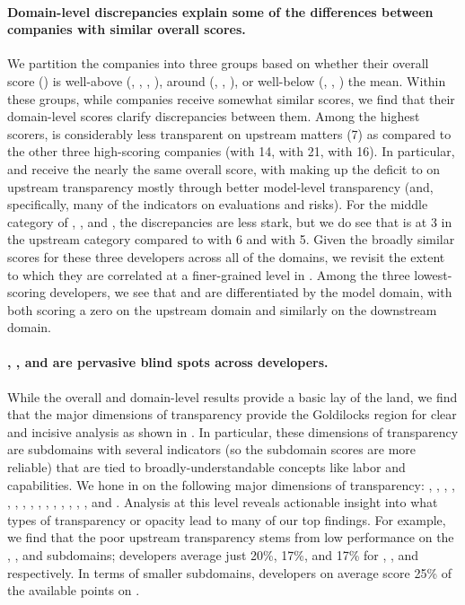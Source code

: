 \paragraph{Domain-level discrepancies explain some of the differences between companies with similar overall scores.}
We partition the \numcompanies companies into three groups based on whether their overall score () is well-above (\meta, \huggingface, \openai, \stability), around (\google, \anthropic, \cohere), or well-below (\aitwentyone, \inflection, \amazon) the mean. 
Within these groups, while companies receive somewhat similar scores, we find that their domain-level scores clarify discrepancies between them. 
Among the highest scorers, \openai is considerably less transparent on upstream matters (7) as compared to the other three high-scoring companies (\meta with 14, \huggingface with 21, \stability with 16).
In particular, \openai and \stability receive the nearly the same overall score, with \openai making up the deficit to \stability on upstream transparency mostly through better model-level transparency (and, specifically, many of the indicators on evaluations and risks).
For the middle category of \google, \anthropic, and \cohere, the discrepancies are less stark, but we do see that \cohere is at 3 in the upstream category compared to \google with 6 and \anthropic with 5.
Given the broadly similar scores for these three developers across all of the domains, we revisit the extent to which they are correlated at a finer-grained level in .
Among the three lowest-scoring developers, we see that \aitwentyone and \inflection are differentiated by the model domain, with both scoring a zero on the upstream domain and similarly on the downstream domain.

\paragraph{\data, \labor, and \compute are pervasive blind spots across developers.} 
While the overall and domain-level results provide a basic lay of the land, we find that the major dimensions of transparency provide the Goldilocks region for clear and incisive analysis as shown in .
In particular, these dimensions of transparency are subdomains with several indicators (so the subdomain scores are more reliable) that are tied to broadly-understandable concepts like labor and capabilities. 
We hone in on the following major dimensions of transparency: \data, \labor, \compute, \methods, \modelbasics, \modelaccess, \capabilities, \risks, \modelmitigations, \distribution, \usagepolicy, \modelbehaviorpolicy, \updates, \dataprotection, \feedback, and \impact. 
Analysis at this level reveals actionable insight into what types of transparency or opacity lead to many of our top findings. 
For example, we find that the poor upstream transparency stems from low performance on the \data, \labor, and \compute subdomains; developers average just 20\%, 17\%, and 17\% for \data, \labor, and \compute respectively. 
In terms of smaller subdomains, developers on average score 25\% of the available points on \datamitigations.

